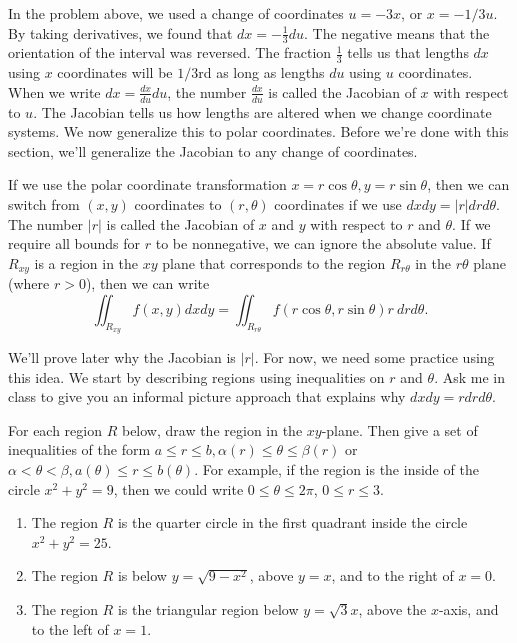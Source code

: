 In the problem above, we used a change of coordinates $u=-3x$, or $x=-1/3 u$.  By taking derivatives, we found that $dx=-\frac{1}{3}du$. The negative means that the orientation of the interval was reversed. The fraction $\frac13$ tells us that lengths $dx$ using $x$ coordinates will be $1/3$rd as long as lengths $du$ using $u$ coordinates. When we write $dx = \frac{dx}{du}du$, the number $\frac{dx}{du}$ is called the Jacobian of $x$ with respect to $u$. The Jacobian tells us how lengths are altered when we change coordinate systems. We now generalize this to polar coordinates. Before we're done with this section, we'll generalize the Jacobian to any change of coordinates.

\begin{theorem}
 If we use the polar coordinate transformation $x=r\cos\theta, y=r\sin\theta$, then we can switch from $(x,y)$ coordinates to $(r,\theta)$ coordinates if we use $dxdy=|r|drd\theta$.  The number $|r|$ is called the Jacobian of $x$ and $y$ with respect to $r$ and $\theta$. If we require all bounds for $r$ to be nonnegative, we can ignore the absolute value.  If $R_{xy}$ is a region in the $xy$ plane that corresponds to the region $R_{r\theta}$ in the $r\theta$ plane (where $r>0$), then we can write $$\iint_{R_{xy}} f(x,y) dxdy = \iint_{R_{r\theta}} f(r\cos\theta,r\sin\theta) r\ drd\theta.$$ 
\end{theorem}
We'll prove later why the Jacobian is $|r|$.  For now, we need some practice using this idea. We start by describing regions using inequalities on $r$ and $\theta$.  Ask me in class to give you an informal picture approach that explains why 
$dxdy=rdrd\theta$.  



\begin{problem}
For each region $R$ below, draw the region in the $xy$-plane. Then give a set of inequalities of the form $a\leq r\leq b, \alpha(r)\leq \theta \leq \beta(r)$ or $\alpha<\theta<\beta, a(\theta)\leq r\leq b(\theta)$. For example, if the region is the inside of the circle $x^2+y^2=9$, then we could write $0\leq \theta\leq 2\pi$, $0\leq r\leq 3$. 
\begin{enumerate}
 \item The region $R$ is the quarter circle in the first quadrant inside the circle $x^2+y^2=25$.
 \item The region $R$ is below $y=\sqrt{9-x^2}$, above $y=x$, and to the right of $x=0$.  
 \item The region $R$ is the triangular region below $y=\sqrt 3 x$, above the $x$-axis, and to the left of $x=1$. 
\end{enumerate}
\end{problem}



